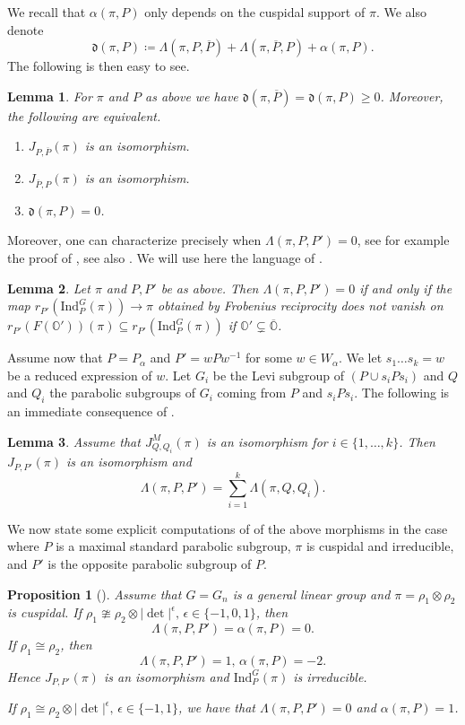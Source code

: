 \documentclass[10pt,a4paper]{article}
\newtheorem{lemma}{Lemma}
\newtheorem{prop}{Proposition}
\theoremstyle{remark}
\theoremstyle{definition}
\newcommand{\ip}{\mathrm{Ind}_P^G}
\newcommand{\op}{\overline{P}}
\newcommand{\ji}{J_{P,P'}}
\newcommand{\ra}{\rightarrow}
\newcommand{\pad}{\mathfrak{d}}
\newcommand{\ain}[3]{#1\in\{#2,\ldots,#3\}}
\newcommand{\oo}{\mathbb{O}}
\begin{document}
We recall that $\alpha(\pi,P)$ only depends on the cuspidal support of $\pi$.
We also denote  \[\pad(\pi,P)\coloneqq \Lambda(\pi,P,\op)+\Lambda(\pi,\op,P)+\alpha(\pi,P).\]
The following is then easy to see.
\begin{lemma}\label{L:pder}
    For $\pi$ and $P$ as above we have $\pad(\pi,\op)=\pad(\pi,P)\ge 0$. Moreover, the following are equivalent.
    \begin{enumerate}
        \item $J_{P,\op}(\pi)$ is an isomorphism.
        \item $J_{\op,P}(\pi)$ is an isomorphism.
        \item $\pad(\pi,P)=0$.
    \end{enumerate}
\end{lemma}
Moreover, one can characterize precisely when $\Lambda(\pi,P,P')=0$, see for example the proof of \cite[Proposition IV.2.2]{waldspurger2003plancherel}, see also \cite[Lemma 4.7]{Droschl2025inter}. We will use here the language of .
\begin{lemma}\label{L:noresidue}
    Let $\pi$ and $P,P'$ be as above. Then $\Lambda(\pi,P,P')=0$ if and only if the map
    $r_{P'}(\ip(\pi))\ra \pi$ obtained by Frobenius reciprocity does not vanish on $r_{P'}(F(\oo'))(\pi)\subseteq r_{P'}(\ip(\pi))$ if $\oo'\subsetneq\overline{\oo}$. 
\end{lemma}
Assume now that $P=P_\alpha$ and $P'=wPw^{-1}$ for some $w\in W_\alpha$. We let $s_1\ldots s_k=w$ be a reduced expression of $w$. 
Let $G_i$ be the Levi subgroup of  $(P\cup s_iPs_i) $ and $Q$ and $Q_i$ the parabolic subgroups of $G_i$ coming from $P$ and $s_iPs_i$.
The following is an immediate consequence of \cite[Proposition 7.8]{Dat05}.
\begin{lemma}\label{L:compositionJ}
    Assume that $J_{Q,Q_i}^M(\pi)$ is an isomorphism for $\ain{i}{1}{k}$. Then $J_{P,P'}(\pi)$ is an isomorphism and \[\Lambda(\pi,P,P')=\sum_{i=1}^k\Lambda(\pi,Q,Q_i).\]
\end{lemma}
We now state some explicit computations of \cite{Dat05} of the above morphisms in the case where $P$ is a maximal standard parabolic subgroup, $\pi$ is cuspidal and irreducible, and $P'$ is the opposite parabolic subgroup of $P$.
\begin{prop}[{\cite[Proposition 8.4]{Dat05}}]\label{P:polesgl}
    Assume that $G=G_n$ is a general linear group and $\pi=\rho_1\otimes\rho_2$ is cuspidal.
    If $\rho_1\ncong\rho_2\otimes\lvert\det\rvert^\epsilon,\,\epsilon\in\{-1,0,1\}$, then \[\Lambda(\pi,P,P')=\alpha(\pi,P)=0.\]
    If $\rho_1\cong \rho_2$, then 
    \[\Lambda(\pi,P,P')=1,\,\alpha(\pi,P)=-2.\]
Hence $\ji(\pi)$ is an isomorphism and $\ip(\pi)$ is irreducible.
    
    If $\rho_1\cong\rho_2\otimes\lvert\det\rvert^\epsilon,\,\epsilon\in\{-1,1\}$, we have that $\Lambda(\pi,P,P')=0$ and $\alpha(\pi,P)=1$.
\end{prop}
\end{document}
